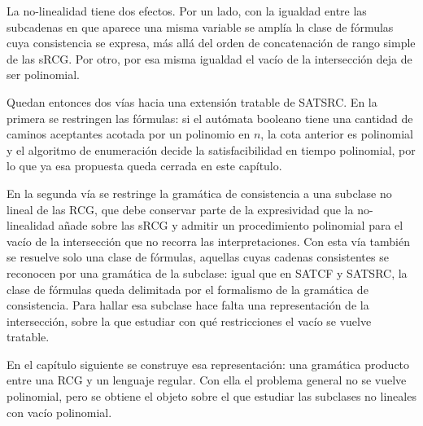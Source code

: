 \documentclass{report}
\theoremstyle{definition}
\theoremstyle{plain}
\theoremstyle{remark}
\begin{document}
La no-linealidad tiene dos efectos. Por un lado, con la igualdad
entre las subcadenas en que aparece una misma variable se amplía la
clase de fórmulas cuya consistencia se expresa, más allá del orden de
concatenación de rango simple de las sRCG. Por otro, por esa misma
igualdad el vacío de la intersección deja de ser polinomial.

Quedan entonces dos vías hacia una extensión tratable de SATSRC. En
la primera se restringen las fórmulas: si el autómata booleano tiene
una cantidad de caminos aceptantes acotada por un polinomio en $n$,
la cota anterior es polinomial y el algoritmo de enumeración
decide la satisfacibilidad en tiempo polinomial, por lo que ya esa
propuesta queda cerrada en este capítulo.

En la segunda vía se restringe la gramática de consistencia a una
subclase no lineal de las RCG, que debe conservar parte de la
expresividad que la no-linealidad añade sobre las sRCG y admitir un
procedimiento polinomial para el vacío de la intersección que no
recorra las interpretaciones. Con esta vía también se resuelve solo
una clase de fórmulas, aquellas cuyas cadenas consistentes se
reconocen por una gramática de la subclase: igual que en SATCF y
SATSRC, la clase de fórmulas queda delimitada por el formalismo de la
gramática de consistencia. Para hallar esa subclase hace falta una
representación  de la intersección, sobre la que estudiar
con qué restricciones el vacío se vuelve tratable.

En el capítulo siguiente se construye esa representación: una gramática
producto entre una RCG y un lenguaje regular. Con ella el problema
general no se vuelve polinomial, pero se obtiene el objeto sobre el que
estudiar las subclases no lineales con vacío polinomial.




\end{document}
